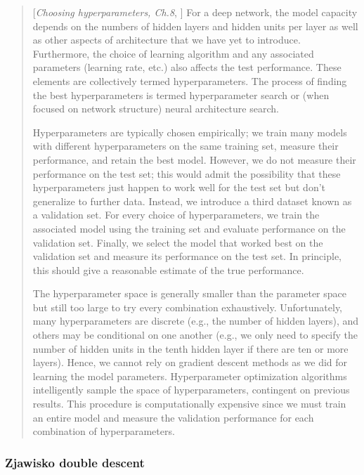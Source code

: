 \documentclass{myclass}
\numberwithin{equation}{subsection}
\begin{document}
\begin{quote}[\textit{Choosing hyperparameters, Ch.8}, \cite{prince2023understanding}]
    For a deep network, the model capacity depends on the numbers of hidden layers and hidden units per
    layer as well as other aspects of architecture that we have yet to introduce. Furthermore, the
    choice of learning algorithm and any associated parameters (learning rate, etc.) also affects the
    test performance. These elements are collectively termed hyperparameters. The process of finding the
    best hyperparameters is termed hyperparameter search or (when focused on network structure) neural
    architecture search.
    
    Hyperparameters are typically chosen empirically; we train many models with different
    hyperparameters on the same training set, measure their performance, and retain the best model.
    However, we do not measure their performance on the test set; this would admit the possibility that
    these hyperparameters just happen to work well for the test set but don't generalize to further
    data. Instead, we introduce a third dataset known as a validation set. For every choice of
    hyperparameters, we train the associated model using the training set and evaluate performance on
    the validation set. Finally, we select the model that worked best on the validation set and measure
    its performance on the test set. In principle, this should give a reasonable estimate of the true
    performance. 
    
    The hyperparameter space is generally smaller than the parameter space but still too
    large to try every combination exhaustively. Unfortunately, many hyperparameters are discrete (e.g.,
    the number of hidden layers), and others may be conditional on one another (e.g., we only need to
    specify the number of hidden units in the tenth hidden layer if there are ten or more layers).
    Hence, we cannot rely on gradient descent methods as we did for learning the model parameters.
    Hyperparameter optimization algorithms intelligently sample the space of hyperparameters, contingent
    on previous results. This procedure is computationally expensive since we must train an entire model
    and measure the validation performance for each combination of hyperparameters.    
\end{quote}


\subsubsection{Zjawisko double descent}
\end{document}
